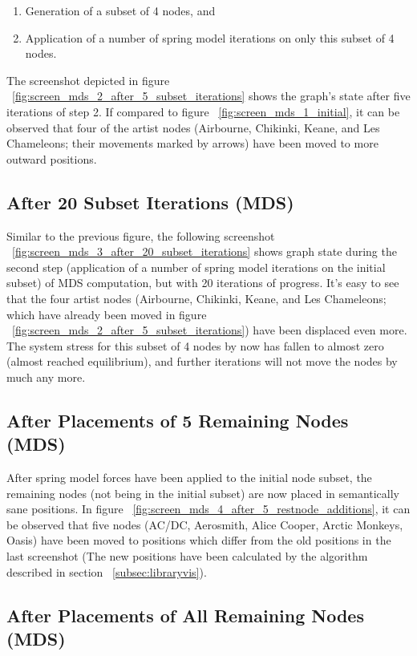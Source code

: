 \begin{enumerate}
	\item Generation of a subset of 4 nodes, and
	\item Application of a number of spring model iterations on only this subset of 4 nodes.
\end{enumerate}

The screenshot depicted in figure ~\ref{fig:screen_mds_2_after_5_subset_iterations} shows the graph's state after five iterations of step 2. If compared to figure ~\ref{fig:screen_mds_1_initial}, it can be observed that four of the artist nodes (Airbourne, Chikinki, Keane, and Les Chameleons; their movements marked by arrows) have been moved to more outward positions.

\subsection{After 20 Subset Iterations (MDS)}

Similar to the previous figure, the following screenshot ~\ref{fig:screen_mds_3_after_20_subset_iterations} shows graph state during the second step (application of a number of spring model iterations on the initial subset) of MDS computation, but with 20 iterations of progress. It's easy to see that the four artist nodes (Airbourne, Chikinki, Keane, and Les Chameleons; which have already been moved in figure ~\ref{fig:screen_mds_2_after_5_subset_iterations}) have been displaced even more. The system stress for this subset of 4 nodes by now has fallen to almost zero (almost reached equilibrium), and further iterations will not move the nodes by much any more.

\subsection{After Placements of 5 Remaining Nodes (MDS)}

After spring model forces have been applied to the initial node subset, the remaining nodes (not being in the initial subset) are now placed in semantically sane positions. In figure ~\ref{fig:screen_mds_4_after_5_restnode_additions}, it can be observed that five nodes (AC/DC, Aerosmith, Alice Cooper, Arctic Monkeys, Oasis) have been moved to positions which differ from the old positions in the last screenshot (The new positions have been calculated by the algorithm described in section ~\ref{subsec:libraryvis}). 

\subsection{After Placements of All Remaining Nodes (MDS)}

